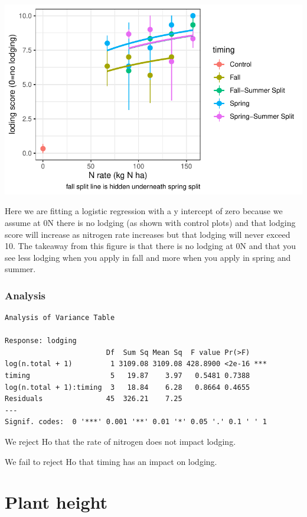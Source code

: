 \documentclass[
  letterpaper,
  DIV=11,
  numbers=noendperiod]{scrartcl}
\begin{document}
\includegraphics{nrate_draft_files/figure-pdf/unnamed-chunk-6-1.pdf}

Here we are fitting a logistic regression with a y intercept of zero
because we assume at 0N there is no lodging (as shown with control
plots) and that lodging score will increase as nitrogen rate increases
but that lodging will never exceed 10. The takeaway from this figure is
that there is no lodging at 0N and that you see less lodging when you
apply in fall and more when you apply in spring and summer.

\hypertarget{analysis}{%
\subsubsection{Analysis}\label{analysis}}

\begin{verbatim}
Analysis of Variance Table

Response: lodging
                        Df  Sum Sq Mean Sq  F value Pr(>F)    
log(n.total + 1)         1 3109.08 3109.08 428.8900 <2e-16 ***
timing                   5   19.87    3.97   0.5481 0.7388    
log(n.total + 1):timing  3   18.84    6.28   0.8664 0.4655    
Residuals               45  326.21    7.25                    
---
Signif. codes:  0 '***' 0.001 '**' 0.01 '*' 0.05 '.' 0.1 ' ' 1
\end{verbatim}

We reject Ho that the rate of nitrogen does not impact lodging.

We fail to reject Ho that timing has an impact on lodging.

\hypertarget{plant-height}{%
\section{Plant height}\label{plant-height}}
\end{document}
